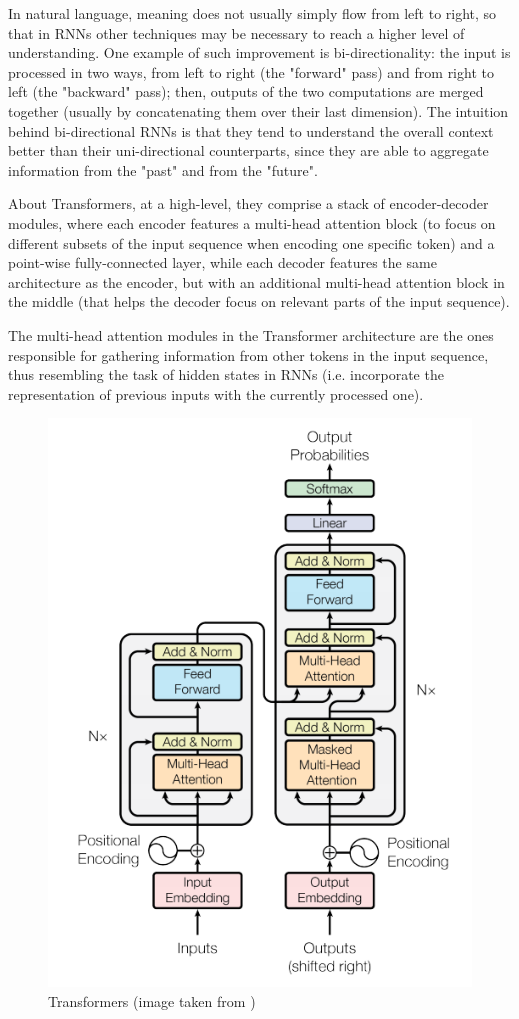 \documentclass[a4paper,10pt]{report}
\begin{document}
In natural language, meaning does not usually simply flow from left to right, so that in RNNs other techniques may be necessary to reach a higher level of understanding. One example of such improvement is bi-directionality: the input is processed in two ways, from left to right (the "forward" pass) and from right to left (the "backward" pass); then, outputs of the two computations are merged together (usually by concatenating them over their last dimension). The intuition behind bi-directional RNNs is that they tend to understand the overall context better than their uni-directional counterparts, since they are able to aggregate information from the "past" and from the "future".

About Transformers, at a high-level, they comprise a stack of encoder-decoder modules, where each encoder features a multi-head attention block (to focus on different subsets of the input sequence when encoding one specific token) and a point-wise fully-connected layer, while each decoder features the same architecture as the encoder, but with an additional multi-head attention block in the middle (that helps the decoder focus on relevant parts of the input sequence).

The multi-head attention modules in the Transformer architecture are the ones responsible for gathering information from other tokens in the input sequence, thus resembling the task of hidden states in RNNs (i.e. incorporate the representation of previous inputs with the currently processed one).

\begin{figure}[h]
  \center
  \includegraphics[width=0.45\linewidth]{transformers}
  \caption{Transformers (image taken from \cite{transformers})}
  \label{fig:transformers}
\end{figure}
\end{document}
